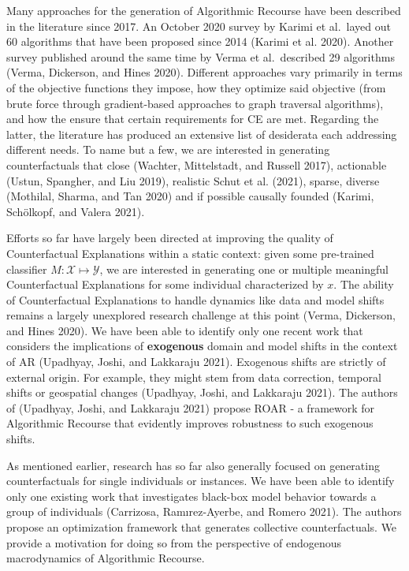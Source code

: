 \documentclass[conference,final,]{IEEEtran}
\begin{document}
Many approaches for the generation of Algorithmic Recourse have been described in the literature since 2017. An October 2020 survey by Karimi et al.~layed out 60 algorithms that have been proposed since 2014 (Karimi et al. 2020). Another survey published around the same time by Verma et al.~described 29 algorithms (Verma, Dickerson, and Hines 2020). Different approaches vary primarily in terms of the objective functions they impose, how they optimize said objective (from brute force through gradient-based approaches to graph traversal algorithms), and how the ensure that certain requirements for CE are met. Regarding the latter, the literature has produced an extensive list of desiderata each addressing different needs. To name but a few, we are interested in generating counterfactuals that close (Wachter, Mittelstadt, and Russell 2017), actionable (Ustun, Spangher, and Liu 2019), realistic Schut et al. (2021), sparse, diverse (Mothilal, Sharma, and Tan 2020) and if possible causally founded (Karimi, Schölkopf, and Valera 2021).

Efforts so far have largely been directed at improving the quality of Counterfactual Explanations within a static context: given some pre-trained classifier \(M: \mathcal{X} \mapsto \mathcal{Y}\), we are interested in generating one or multiple meaningful Counterfactual Explanations for some individual characterized by \(x\). The ability of Counterfactual Explanations to handle dynamics like data and model shifts remains a largely unexplored research challenge at this point (Verma, Dickerson, and Hines 2020). We have been able to identify only one recent work that considers the implications of \textbf{exogenous} domain and model shifts in the context of AR (Upadhyay, Joshi, and Lakkaraju 2021). Exogenous shifts are strictly of external origin. For example, they might stem from data correction, temporal shifts or geospatial changes (Upadhyay, Joshi, and Lakkaraju 2021). The authors of (Upadhyay, Joshi, and Lakkaraju 2021) propose ROAR - a framework for Algorithmic Recourse that evidently improves robustness to such exogenous shifts.

As mentioned earlier, research has so far also generally focused on generating counterfactuals for single individuals or instances. We have been able to identify only one existing work that investigates black-box model behavior towards a group of individuals (Carrizosa, Ramırez-Ayerbe, and Romero 2021). The authors propose an optimization framework that generates collective counterfactuals. We provide a motivation for doing so from the perspective of endogenous macrodynamics of Algorithmic Recourse.
\end{document}
